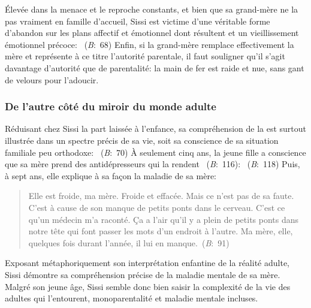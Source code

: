 Élevée dans la menace et le reproche constants, et bien que sa grand-mère ne la  pas vraiment en famille d'accueil, Sissi est victime d'une véritable forme d'abandon sur les plans affectif et émotionnel dont résultent  et un vieillissement émotionnel précoce: ~(\textit{B}:~68)
Enfin, si la grand-mère remplace effectivement la mère et représente à ce titre l'autorité parentale, il faut souligner qu'il s'agit davantage d'autorité que de parentalité: la main de fer est raide et nue, sans gant de velours pour l'adoucir.

\subsubsection{De l'autre côté du miroir du monde adulte}
Réduisant chez Sissi la part laissée à l'enfance, sa compréhension de la  est surtout illustrée dans un spectre précis de sa vie, soit sa conscience de sa situation familiale peu orthodoxe: ~(\textit{B}:~70)
À seulement cinq ans, la jeune fille a conscience que sa mère prend des antidépresseurs qui la rendent ~(\textit{B}:~116):
~(\textit{B}:~118)
Puis, à sept ans, elle explique à sa façon la maladie de sa mère:
\begin{quote}
  \begin{singlespace}
    \small
    Elle est froide, ma mère. Froide et effacée. Mais ce n'est pas de sa faute. C'est à cause de son manque de petits ponts dans le cerveau. C'est ce qu'un médecin m'a raconté. Ça a l'air qu'il y a plein de petits ponts dans notre tête qui font passer les mots d'un endroit à l'autre. Ma mère, elle, quelques fois durant l'année, il lui en manque.~(\textit{B}:~91)
    \normalsize
  \end{singlespace}
\end{quote}
Exposant métaphoriquement son interprétation enfantine de la réalité adulte, Sissi démontre sa compréhension précise de la maladie mentale de sa mère.
Malgré son jeune âge, Sissi semble donc bien saisir la complexité de la vie des adultes qui l'entourent, monoparentalité et maladie mentale incluses.
